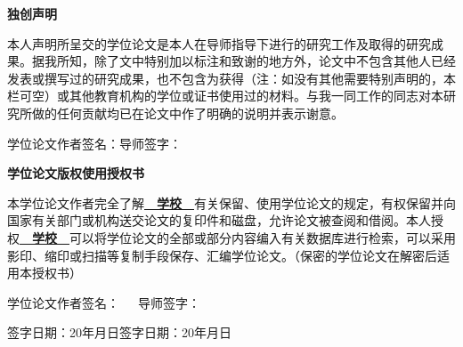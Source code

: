 \begin{titlepage}
	\vspace*{1.3cm}
	\begin{center}
	\fontsize{16pt}{\baselineskip}
	\textbf{独}\quad\textbf{创}\quad\textbf{声}\quad\textbf{明}
	\end{center}
	\vspace*{24pt}
	\begin{spacing}{1.5}
	\fontsize{12pt}{\baselineskip}
	本人声明所呈交的学位论文是本人在导师指导下进行的研究工作及取得的研究成果。据我所知，除了文中特别加以标注和致谢的地方外，论文中不包含其他人已经发表或撰写过的研究成果，也不包含为获得\underline{\quad\quad\quad\quad\quad\quad\quad\quad}（注：如没有其他需要特别声明的，本栏可空）或其他教育机构的学位或证书使用过的材料。与我一同工作的同志对本研究所做的任何贡献均已在论文中作了明确的说明并表示谢意。
	\end{spacing}
	\vspace*{18pt}
	\begin{flushright}
	学位论文作者签名：\quad\quad\quad\quad\quad\quad\quad\quad 导师签字： \quad\quad\quad\quad\quad\quad\quad\quad
	\end{flushright}
	\vspace*{54pt}
	\begin{center}
	\fontsize{16pt}{\baselineskip}
	\textbf{学}\quad\textbf{位}\quad\textbf{论}\quad\textbf{文}\quad\textbf{版}\quad\textbf{权}\quad\textbf{使}\quad\textbf{用}\quad\textbf{授}\quad\textbf{权}\quad\textbf{书}
	\end{center}
	\vspace*{18pt}
	\begin{spacing}{1.5}
	\fontsize{12pt}{\baselineskip}
	本学位论文作者完全了解\underline{~~\textbf{学校}~~}有关保留、使用学位论文的规定，有权保留并向国家有关部门或机构送交论文的复印件和磁盘，允许论文被查阅和借阅。本人授权\underline{~~\textbf{学校}~~}可以将学位论文的全部或部分内容编入有关数据库进行检索，可以采用影印、缩印或扫描等复制手段保存、汇编学位论文。（保密的学位论文在解密后适用本授权书）
	\end{spacing}
	\begin{flushright}
	学位论文作者签名：~~\quad\quad\quad\quad\quad\quad\quad\quad\quad\quad~导师签字：~\quad\quad\quad\quad\quad\quad\quad\quad\quad\quad
	\vspace*{18pt}

	签字日期：20\quad 年\quad 月\quad 日\quad\quad\quad\quad\quad\quad\quad\quad 签字日期：20\quad 年\quad 月\quad 日 \quad\quad\quad\quad\
	\end{flushright}
	\vspace*{18pt}
	
\end{titlepage}